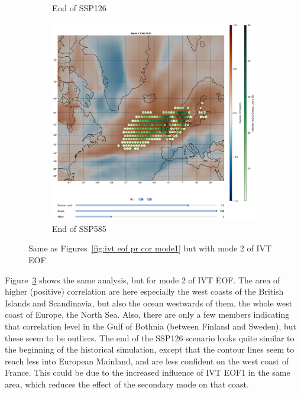 \begin{figure}[!htb]
\begin{subfigure}[b]{0.32\textwidth}
    \caption{End of SSP126} 
    \label{fig:ivt eof pr cor ssp126 mode2}
  \end{subfigure}
  \begin{subfigure}[b]{0.32\textwidth}
    \includegraphics[width=\textwidth]{figures/ivt_pr_cor_mode2_ssp585_hexbin.png}
    \caption{End of SSP585}
    \label{fig:ivt eof pr cor ssp585 mode2}
  \end{subfigure}
  \caption{Same as Figures~\ref{fig:ivt eof pr cor mode1} but with mode 2 of IVT EOF.}
  \label{fig:ivt eof pr cor mode2}
\end{figure}

Figure~\ref{fig:ivt eof pr cor mode2} shows the same analysis, but for mode 2 of IVT EOF. 
The area of higher (positive) correlation are here especially the west coasts of the British Islands and Scandinavia, but also the ocean westwards of them, the whole west coast of Europe, the North Sea. 
Also, there are only a few members indicating that correlation level in the Gulf of Bothnia (between Finland and Sweden), but these seem to be outliers. 
The end of the SSP126 scenario looks quite similar to the beginning of the historical simulation, except that the contour lines seem to reach less into European Mainland, and are less confident on the west coast of France.  
This could be due to the increased influence of IVT EOF1 in the same area, which reduces the effect of the secondary mode on that coast. 


